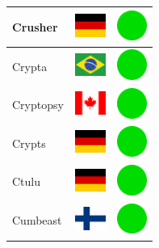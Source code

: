 \documentclass[12pt, a4paper, twoside]{report}
\begin{document}
\begin{center}
\begin{longtable}{|p{5cm}|p{2cm}|p{2cm}|}
			Crusher & \includegraphics[width=1cm]{4x3/de} & \includegraphics[width=1cm]{likes/y} \\ \hline
			Crypta & \includegraphics[width=1cm]{4x3/br} & \includegraphics[width=1cm]{likes/y} \\ \hline
			Cryptopsy & \includegraphics[width=1cm]{4x3/ca} & \includegraphics[width=1cm]{likes/y} \\ \hline
			Crypts & \includegraphics[width=1cm]{4x3/de} & \includegraphics[width=1cm]{likes/y} \\ \hline
			Ctulu & \includegraphics[width=1cm]{4x3/de} & \includegraphics[width=1cm]{likes/y} \\ \hline
			Cumbeast & \includegraphics[width=1cm]{4x3/fi} & \includegraphics[width=1cm]{likes/y} \\ \hline

\end{longtable}
\end{center}
\end{document}
